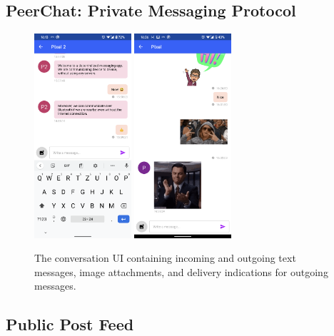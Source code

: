 \subsection{PeerChat: Private Messaging Protocol}

\begin{figure}
    \centering
    \includegraphics[width=0.32\textwidth]{screens/superapp/conversation_text}
    \includegraphics[width=0.32\textwidth]{screens/superapp/conversation}
    \caption{The conversation UI containing incoming and outgoing text messages, image attachments, and delivery indications for outgoing messages.}
    \label{manyverse}
\end{figure}

\subsection{Public Post Feed}


